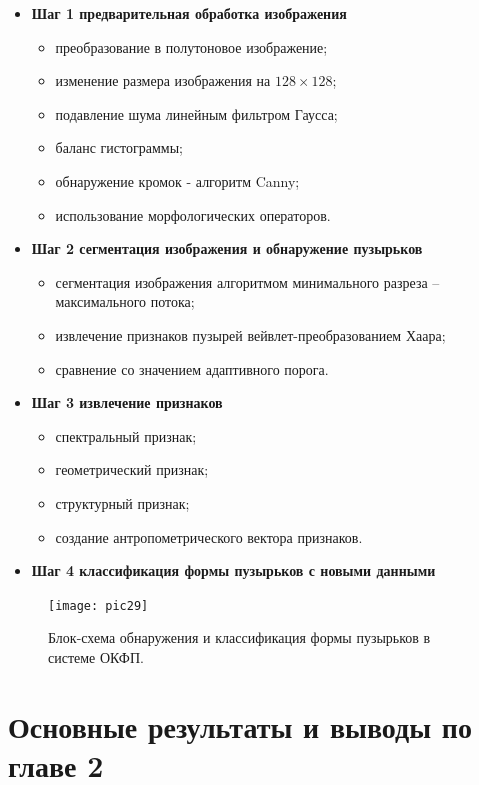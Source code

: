 \documentclass[a4paper,14pt]{extreport}
\begin{document}
\begin{itemize}
	\item \textbf{Шаг 1 предварительная обработка изображения}
	
	\begin{itemize}
	\item преобразование в полутоновое изображение;
	\item изменение размера изображения на $128 \times 128$;
	\item подавление шума линейным фильтром Гаусса; 
	\item баланс гистограммы;
	\item обнаружение кромок - алгоритм Canny;
	\item использование морфологических операторов.

	\end{itemize}

\item \textbf{Шаг 2 сегментация изображения и обнаружение пузырьков}

\begin{itemize}
	\item сегментация изображения алгоритмом минимального разреза -- максимального потока;
	\item извлечение признаков пузырей вейвлет-преобразованием Хаара;
	\item сравнение со значением адаптивного порога.

\end{itemize}

\item \textbf{Шаг 3 извлечение признаков}

\begin{itemize}
	\item спектральный признак;
	\item геометрический признак;
	\item структурный признак;
	\item создание антропометрического вектора признаков.
\end{itemize}
\item \textbf{Шаг 4 классификация формы пузырьков с новыми данными}

\end{itemize}
\begin{figure}[ht!]
\centering
\texttt{[image: pic29]}
\caption{Блок-схема обнаружения и классификация формы пузырьков в системе ОКФП.}
	\label{pic29}
		\end{figure}
\section{Основные результаты и выводы по главе 2}
\end{document}
